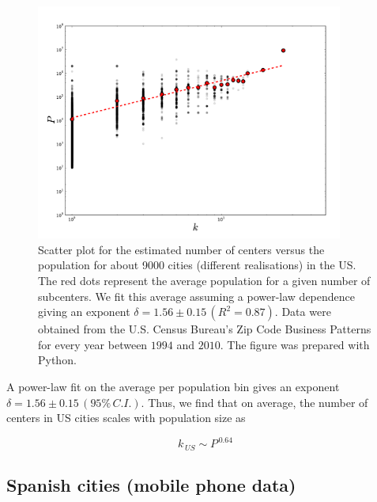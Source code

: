 \begin{figure}
    \centering
    \includegraphics[width=0.9\textwidth]{gfx/chapter-monocentric/us_num-centers.pdf}
    \caption{Scatter plot for the estimated number of centers versus the
    population for about 9000 cities (different realisations) in the US. The red
dots represent the average population for a given number of subcenters. We fit
this average assuming a power-law dependence giving an exponent $\delta = 1.56
    \pm 0.15\,(R^2=0.87)$. Data were obtained from the U.S. Census Bureau's Zip
Code Business Patterns for every year between $1994$ and $2010$. The figure was
prepared with Python.\label{fig:us_centers}}
\end{figure}


A power-law fit on the average per population bin gives an exponent $\delta =
1.56 \pm 0.15\,(95\%\,C.I.)$. Thus, we find that on average, the number of
centers in US cities scales with population size as

\begin{equation}
    k_{\,US} \sim P^{\,0.64}
\end{equation}

\subsection{Spanish cities (mobile phone data)}
\label{sub:spanish_cities_mobile_phone_data_}

